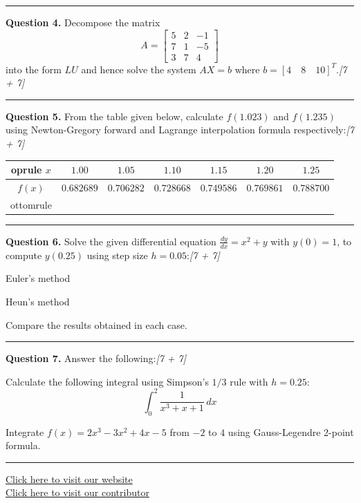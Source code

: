 \documentclass[11pt,a4paper]{article}
\newcommand{\pts}[1]{\hfill   \textit{[#1]}}
\begin{document}
\medskip\rule{\linewidth}{0.2pt}\medskip




\noindent   \textbf{Question 4.} Decompose the matrix
\[
  A = 
\begin{bmatrix} 5 & 2 & -1 \\ 7 & 1 & -5 \\ 3 & 7 & 4 \end{bmatrix}
\]
into the form $LU$ and hence solve the system $AX = b$ where $b = [4 \quad 8 \quad 10]^T$.\pts{7 + 7}

\medskip\rule{\linewidth}{0.2pt}\medskip




\noindent   \textbf{Question 5.} From the table given below, calculate $f(1.023)$ and $f(1.235)$ using Newton-Gregory forward and Lagrange interpolation formula respectively:\pts{7 + 7}

\begin{center}
  
\begin{tabular}{@{}ccccccc@{}}
     oprule
    $x$ & $1.00$ & $1.05$ & $1.10$ & $1.15$ & $1.20$ & $1.25$ \\
    \midrule
    $f(x)$ & $0.682689$ & $0.706282$ & $0.728668$ & $0.749586$ & $0.769861$ & $0.788700$ \\
    ottomrule
  \end{tabular}
\end{center}

\medskip\rule{\linewidth}{0.2pt}\medskip




\noindent   \textbf{Question 6.} Solve the given differential equation $\frac{dy}{dx} = x^2 + y$ with $y(0) = 1$, to compute $y(0.25)$ using step size $h = 0.05$:\pts{7 + 7}

\begin{parts}
  \item Euler's method
  \item Heun's method
\end{parts}



\noindent Compare the results obtained in each case.

\medskip\rule{\linewidth}{0.2pt}\medskip




\noindent   \textbf{Question 7.} Answer the following:\pts{7 + 7}

\begin{parts}
  \item Calculate the following integral using Simpson's $1/3$ rule with $h = 0.25$:
  \[
    \int_{0}^{2} \frac{1}{x^3 + x + 1} \, dx
  \]
  \item Integrate $f(x) = 2x^3 - 3x^2 + 4x - 5$ from $-2$ to $4$ using Gauss-Legendre 2-point formula.
\end{parts}

\vfill
\rule{\linewidth}{0.4pt}

\begin{center}\small
\href{https://bhu-exam.vercel.app/}{Click here to visit our website}\\[4pt]
\href{https://me-aryan.vercel.app/}{Click here to visit our contributor}
\end{center}
\end{document}
